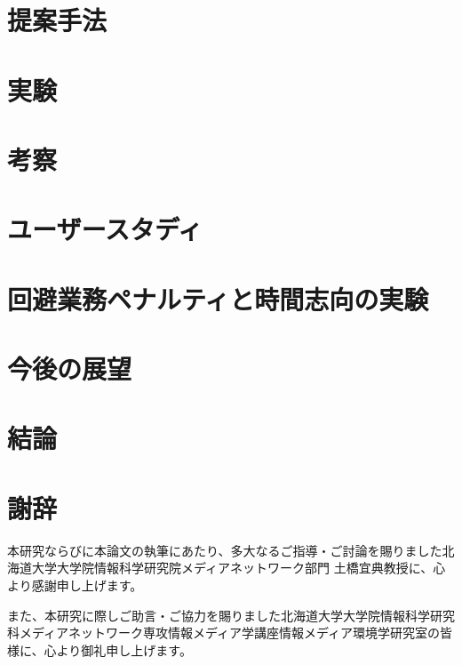 \documentclass[11pt,a4paper,report,ja=standard,lualatex]{bxjsreport}
\begin{document}
\chapter{提案手法}
\label{chap:method}


\chapter{実験}
\label{chap:experiment}


\chapter{考察}
\label{chap:consideration}


\chapter{ユーザースタディ}
\label{chap:userstudy}


\chapter{回避業務ペナルティと時間志向の実験}
\label{chap:avoidance-penalty}


\chapter{今後の展望}
\label{chap:future}


\chapter{結論}
\label{chap:conclusion}


\clearpage
\chapter*{謝辞}

本研究ならびに本論文の執筆にあたり、多大なるご指導・ご討論を賜りました北海道大学大学院情報科学研究院メディアネットワーク部門 土橋宜典教授に、心より感謝申し上げます。

また、本研究に際しご助言・ご協力を賜りました北海道大学大学院情報科学研究科メディアネットワーク専攻情報メディア学講座情報メディア環境学研究室の皆様に、心より御礼申し上げます。
\end{document}
